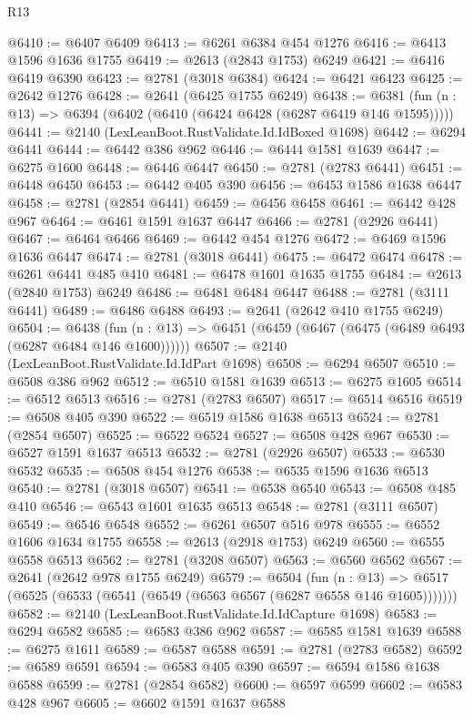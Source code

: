\begin{lexlean}{R13}
\begin{coremodule}
@6410 := @6407 @6409
@6413 := @6261 @6384 @454 @1276
@6416 := @6413 @1596 @1636 @1755
@6419 := @2613 (@2843 @1753) @6249
@6421 := @6416 @6419 @6390
@6423 := @2781 (@3018 @6384)
@6424 := @6421 @6423
@6425 := @2642 @1276
@6428 := @2641 (@6425 @1755 @6249)
@6438 := @6381 (fun (n : @13) => @6394 (@6402 (@6410 (@6424 @6428 (@6287 @6419 @146 @1595)))))
@6441 := @2140 (LexLeanBoot.RustValidate.Id.IdBoxed @1698)
@6442 := @6294 @6441
@6444 := @6442 @386 @962
@6446 := @6444 @1581 @1639
@6447 := @6275 @1600
@6448 := @6446 @6447
@6450 := @2781 (@2783 @6441)
@6451 := @6448 @6450
@6453 := @6442 @405 @390
@6456 := @6453 @1586 @1638 @6447
@6458 := @2781 (@2854 @6441)
@6459 := @6456 @6458
@6461 := @6442 @428 @967
@6464 := @6461 @1591 @1637 @6447
@6466 := @2781 (@2926 @6441)
@6467 := @6464 @6466
@6469 := @6442 @454 @1276
@6472 := @6469 @1596 @1636 @6447
@6474 := @2781 (@3018 @6441)
@6475 := @6472 @6474
@6478 := @6261 @6441 @485 @410
@6481 := @6478 @1601 @1635 @1755
@6484 := @2613 (@2840 @1753) @6249
@6486 := @6481 @6484 @6447
@6488 := @2781 (@3111 @6441)
@6489 := @6486 @6488
@6493 := @2641 (@2642 @410 @1755 @6249)
@6504 := @6438
    (fun (n : @13) => @6451 (@6459 (@6467 (@6475 (@6489 @6493 (@6287 @6484 @146 @1600))))))
@6507 := @2140 (LexLeanBoot.RustValidate.Id.IdPart @1698)
@6508 := @6294 @6507
@6510 := @6508 @386 @962
@6512 := @6510 @1581 @1639
@6513 := @6275 @1605
@6514 := @6512 @6513
@6516 := @2781 (@2783 @6507)
@6517 := @6514 @6516
@6519 := @6508 @405 @390
@6522 := @6519 @1586 @1638 @6513
@6524 := @2781 (@2854 @6507)
@6525 := @6522 @6524
@6527 := @6508 @428 @967
@6530 := @6527 @1591 @1637 @6513
@6532 := @2781 (@2926 @6507)
@6533 := @6530 @6532
@6535 := @6508 @454 @1276
@6538 := @6535 @1596 @1636 @6513
@6540 := @2781 (@3018 @6507)
@6541 := @6538 @6540
@6543 := @6508 @485 @410
@6546 := @6543 @1601 @1635 @6513
@6548 := @2781 (@3111 @6507)
@6549 := @6546 @6548
@6552 := @6261 @6507 @516 @978
@6555 := @6552 @1606 @1634 @1755
@6558 := @2613 (@2918 @1753) @6249
@6560 := @6555 @6558 @6513
@6562 := @2781 (@3208 @6507)
@6563 := @6560 @6562
@6567 := @2641 (@2642 @978 @1755 @6249)
@6579 := @6504
    (fun (n : @13) => @6517 (@6525 (@6533 (@6541 (@6549 (@6563 @6567 (@6287 @6558 @146 @1605)))))))
@6582 := @2140 (LexLeanBoot.RustValidate.Id.IdCapture @1698)
@6583 := @6294 @6582
@6585 := @6583 @386 @962
@6587 := @6585 @1581 @1639
@6588 := @6275 @1611
@6589 := @6587 @6588
@6591 := @2781 (@2783 @6582)
@6592 := @6589 @6591
@6594 := @6583 @405 @390
@6597 := @6594 @1586 @1638 @6588
@6599 := @2781 (@2854 @6582)
@6600 := @6597 @6599
@6602 := @6583 @428 @967
@6605 := @6602 @1591 @1637 @6588

\end{coremodule}
\end{lexlean}
